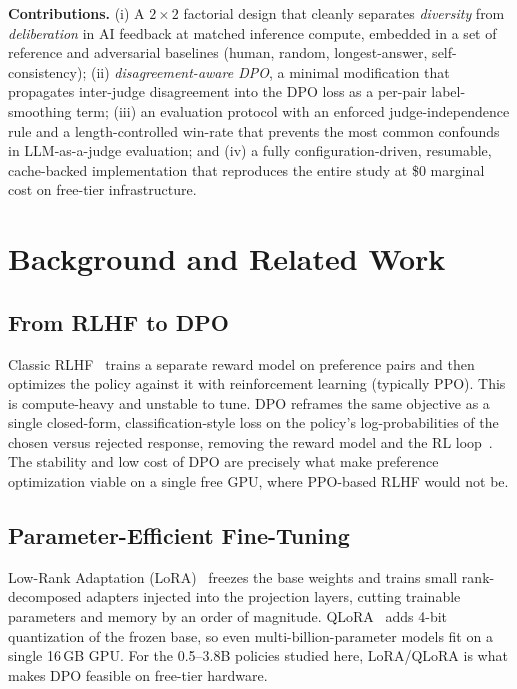 \documentclass[conference]{IEEEtran}
\begin{document}
\noindent\textbf{Contributions.}
(i) A $2{\times}2$ factorial design that cleanly separates \emph{diversity} from
\emph{deliberation} in AI feedback at matched inference compute, embedded in a set
of reference and adversarial baselines (human, random, longest-answer,
self-consistency);
(ii) \emph{disagreement-aware DPO}, a minimal modification that propagates
inter-judge disagreement into the DPO loss as a per-pair label-smoothing term;
(iii) an evaluation protocol with an enforced judge-independence rule and a
length-controlled win-rate that prevents the most common confounds in
LLM-as-a-judge evaluation; and
(iv) a fully configuration-driven, resumable, cache-backed implementation that
reproduces the entire study at \$0 marginal cost on free-tier infrastructure.

\section{Background and Related Work}

\subsection{From RLHF to DPO}
Classic RLHF~\cite{ouyang2022instructgpt} trains a separate reward model on
preference pairs and then optimizes the policy against it with reinforcement
learning (typically PPO). This is compute-heavy and unstable to tune. DPO
reframes the same objective as a single closed-form, classification-style loss on
the policy's log-probabilities of the chosen versus rejected response, removing
the reward model and the RL loop~\cite{rafailov2023dpo}. The stability and low
cost of DPO are precisely what make preference optimization viable on a single
free GPU, where PPO-based RLHF would not be.

\subsection{Parameter-Efficient Fine-Tuning}
Low-Rank Adaptation (LoRA)~\cite{hu2021lora} freezes the base weights and trains
small rank-decomposed adapters injected into the projection layers, cutting
trainable parameters and memory by an order of magnitude. QLoRA~\cite{dettmers2023qlora}
adds 4-bit quantization of the frozen base, so even multi-billion-parameter models
fit on a single 16\,GB GPU. For the 0.5--3.8B policies studied here, LoRA/QLoRA is
what makes DPO feasible on free-tier hardware.
\end{document}

